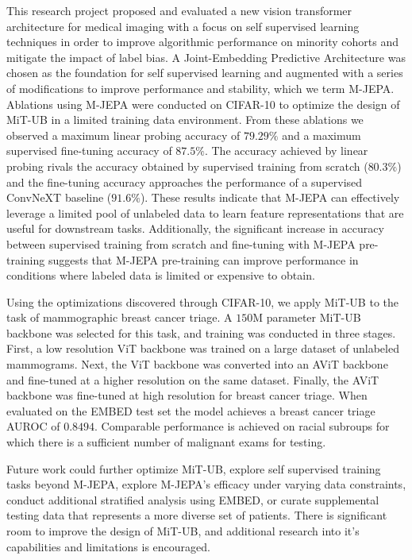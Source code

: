 \documentclass[12pt]{article}
\begin{document}
This research project proposed and evaluated a new vision transformer architecture for medical imaging with a focus on
self supervised learning techniques in order to improve algorithmic performance on minority cohorts and mitigate the impact of label bias.
A Joint-Embedding Predictive Architecture was chosen as the foundation for self supervised learning and augmented with a series of modifications to improve performance and stability, which we term M-JEPA. Ablations using M-JEPA were conducted on CIFAR-10 to optimize the design of MiT-UB in a limited training data environment. From these ablations we observed a maximum linear probing accuracy of $79.29\%$ and a maximum supervised fine-tuning accuracy of $87.5\%$. The accuracy achieved by linear probing rivals the accuracy obtained by supervised training from scratch ($80.3\%$) and the fine-tuning accuracy approaches the performance of a supervised ConvNeXT baseline ($91.6\%$). These results indicate that M-JEPA can effectively leverage a limited pool of unlabeled data to learn feature representations that are useful for downstream tasks.
Additionally, the significant increase in accuracy between supervised training from scratch and fine-tuning with M-JEPA pre-training suggests that M-JEPA pre-training can improve performance in conditions where labeled data is limited or expensive to obtain.

Using the optimizations discovered through CIFAR-10, we apply MiT-UB to the task of mammographic breast cancer triage. 
A $150\mathrm{M}$ parameter MiT-UB backbone was selected for this task, and training was conducted in three stages. First, a low resolution ViT backbone was trained on a large dataset of unlabeled mammograms. Next, the ViT backbone was converted into an AViT backbone and fine-tuned at a higher resolution on the same dataset. Finally, the AViT backbone was fine-tuned at high resolution for breast cancer triage.
When evaluated on the EMBED test set the model achieves a breast cancer triage AUROC of $0.8494$. Comparable performance is achieved on racial subroups for which there is a sufficient number of malignant exams for testing.

Future work could further optimize MiT-UB, explore self supervised training tasks beyond M-JEPA, explore M-JEPA's efficacy under varying data constraints, conduct additional stratified analysis using EMBED, or curate supplemental testing data that represents a more diverse set of patients.
There is significant room to improve the design of MiT-UB, and additional research into it's capabilities and limitations is encouraged.
\end{document}
